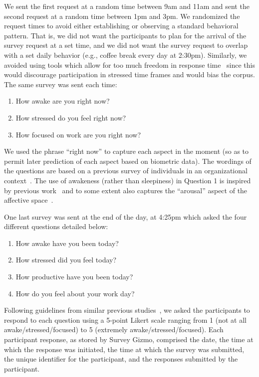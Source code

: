 We sent the 
first request at a random time between 9am and 11am 
and sent the second request at a random time between 1pm and 3pm. We 
randomized the request times to avoid either establishing or observing a 
standard behavioral pattern. That is, we did not want the participants to 
plan for the arrival of the survey request at a set time, and we did not 
want the survey request to overlap with a set daily behavior (e.g., coffee 
break every day at 2:30pm). Similarly, we avoided using tools which allow 
for too much freedom in response time~\cite{Adams18} since this would 
discourage participation in stressed time frames and would bias the 
corpus. 
The same survey was sent each time:
\begin{enumerate}
\item How awake are you right now?
\item How stressed do you feel right now?
\item How focused on work are you right now? 
\end{enumerate}
We used the phrase ``right now'' to capture each aspect in the moment (so as to permit later prediction of each aspect based on biometric data). The wordings of the questions are based on a previous survey of individuals in an organizational context~\cite{Gloor_etal:2010}. The use of awakeness (rather than sleepiness) in Question 1 is inspired by previous work~\cite{Wilhelm_Schoebi:2007} and to some extent also captures the ``arousal'' aspect of the affective space~\cite{Russell:1980}.


One last survey was sent at the end of the day, at 4:25pm which asked the 
four different questions
detailed below:
\begin{enumerate}
\item How awake have you been today?
\item How stressed did you feel today?
\item How productive have you been today?
\item How do you feel about your work day?
\end{enumerate}

Following guidelines from similar previous studies~\cite{fogarty05,tanaka11}, we asked the participants to respond to each question using a 5-point Likert scale ranging from 1 (not at all awake/stressed/focused) to 5 (extremely awake/stressed/focused). Each participant response, as stored by Survey Gizmo, comprised the date, the time at which the response was initiated, the time at which the survey was submitted, the unique identifier for the participant, and the responses submitted by the participant.

